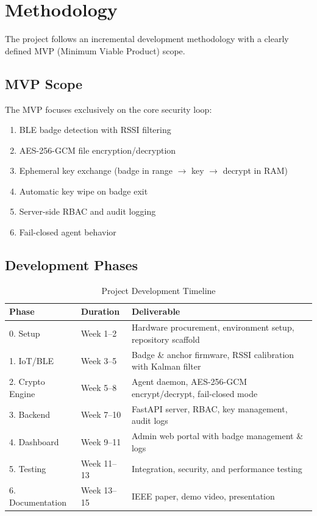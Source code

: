 \documentclass[conference]{IEEEtran}
\begin{document}
\section{Methodology}

The project follows an incremental development methodology with a clearly defined MVP (Minimum Viable Product) scope.

\subsection{MVP Scope}
The MVP focuses exclusively on the core security loop:
\begin{enumerate}[noitemsep]
    \item BLE badge detection with RSSI filtering
    \item AES-256-GCM file encryption/decryption
    \item Ephemeral key exchange (badge in range $\rightarrow$ key $\rightarrow$ decrypt in RAM)
    \item Automatic key wipe on badge exit
    \item Server-side RBAC and audit logging
    \item Fail-closed agent behavior
\end{enumerate}

\subsection{Development Phases}
\begin{table}[htbp]
    \centering
    \caption{Project Development Timeline}
    \label{tab:timeline}
    \begin{tabularx}{\columnwidth}{l l X}
        \toprule
        \textbf{Phase} & \textbf{Duration} & \textbf{Deliverable} \\
        \midrule
        0. Setup & Week 1--2 & Hardware procurement, environment setup, repository scaffold \\
        1. IoT/BLE & Week 3--5 & Badge \& anchor firmware, RSSI calibration with Kalman filter \\
        2. Crypto Engine & Week 5--8 & Agent daemon, AES-256-GCM encrypt/decrypt, fail-closed mode \\
        3. Backend & Week 7--10 & FastAPI server, RBAC, key management, audit logs \\
        4. Dashboard & Week 9--11 & Admin web portal with badge management \& logs \\
        5. Testing & Week 11--13 & Integration, security, and performance testing \\
        6. Documentation & Week 13--15 & IEEE paper, demo video, presentation \\
        \bottomrule
    \end{tabularx}
\end{table}
\end{document}
